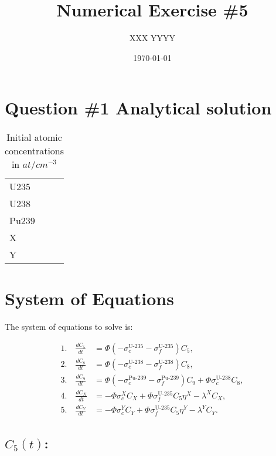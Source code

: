 \documentclass[11pt,a4paper]{article}
\begin{document}
\title{Numerical Exercise \#5}
\author{XXX YYYY\\  %
}
\date{\today}
\maketitle



\newpage
\section{Question \#1 Analytical solution}


\begin{table}[H]
	\centering
	\begin{tabular}{|l|c|}
		\hline
		U235& \\
		U238& \\
		Pu239& \\
		X& \\
		Y& \\
		\hline
	\end{tabular}
	\caption{Initial atomic concentrations in $at/cm^{-3}$}
\end{table}

\section*{System of Equations}

The system of equations to solve is:

\[
\begin{aligned}
1. \quad \frac{dC_5}{dt} &= \Phi \left(-\sigma_c^{\text{U-235}} - \sigma_f^{\text{U-235}}\right) C_5, \\
2. \quad \frac{dC_8}{dt} &= \Phi \left(-\sigma_c^{\text{U-238}} - \sigma_f^{\text{U-238}}\right) C_8, \\
3. \quad \frac{dC_9}{dt} &= \Phi \left(-\sigma_c^{\text{Pu-239}} - \sigma_f^{\text{Pu-239}}\right) C_9 + \Phi \sigma_c^{\text{U-238}} C_8, \\
4. \quad \frac{dC_X}{dt} &= -\Phi \sigma_c^X C_X + \Phi \sigma_f^{\text{U-235}} C_5 \eta^X - \lambda^X C_X, \\
5. \quad \frac{dC_Y}{dt} &= -\Phi \sigma_c^Y C_Y + \Phi \sigma_f^{\text{U-235}} C_5 \eta^Y - \lambda^Y C_Y.
\end{aligned}
\]


\subsection*{\(C_5(t)\):}
\end{document}
